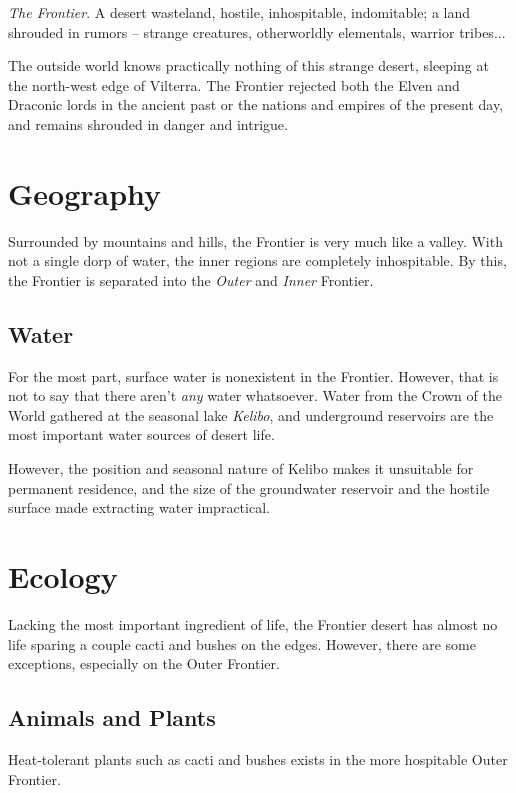 \documentclass[../main.tex]{subfiles}
\begin{document}
\emph{The Frontier}. A desert wasteland, hostile, inhospitable, indomitable;
a land shrouded in rumors -- strange creatures, otherworldly elementals,
warrior tribes...

The outside world knows practically nothing of this strange desert,
sleeping at the north-west edge of Vilterra. The Frontier rejected both the Elven
and Draconic lords in the ancient past or the nations and empires of the present
day, and remains shrouded in danger and intrigue.

\section{Geography}
Surrounded by mountains and hills, the Frontier is very much like a valley.
With not a single dorp of water, the inner regions are completely inhospitable.
By this, the Frontier is separated into the \emph{Outer} and \emph{Inner}
Frontier.

\subsection{Water}
For the most part, surface water is nonexistent in the Frontier. However,
that is not to say that there aren't \emph{any} water whatsoever.
Water from the Crown of the World gathered at the seasonal lake \emph{Kelibo},
and underground reservoirs are the most important water sources of desert
life.

However, the position and seasonal nature of
Kelibo makes it unsuitable for permanent residence, and the size of the
groundwater reservoir and the hostile surface made extracting water impractical.

\section{Ecology}
Lacking the most important ingredient of life, the Frontier desert has
almost no life sparing a couple cacti and bushes on the edges. However,
there are some exceptions, especially on the Outer Frontier.

\subsection{Animals and Plants}
Heat-tolerant plants such as cacti and bushes exists in the more
hospitable Outer Frontier.
\end{document}

